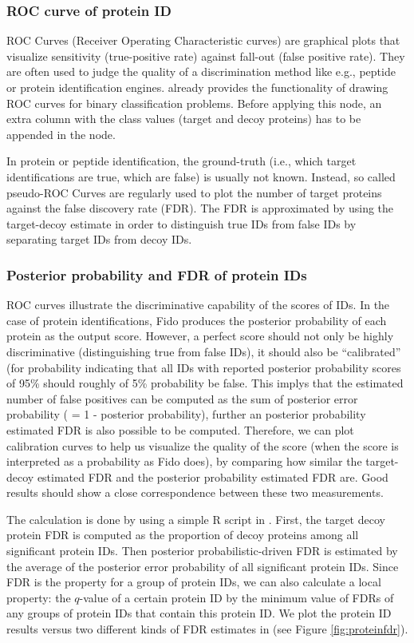 \subsubsection{ROC curve of protein ID}

ROC Curves (Receiver Operating Characteristic curves) are graphical plots that visualize sensitivity (true-positive rate) 
against fall-out (false positive rate). They are often used to judge the quality of a discrimination method like e.g., 
peptide or protein identification engines. 
 already provides the functionality of drawing ROC curves for binary classification problems. 
Before applying this node, an extra column with the class values (target and decoy proteins) has to be appended in 
the  node. 

In protein or peptide identification, the ground-truth (i.e., which target identifications are true, which are false) is usually not known. Instead, so called pseudo-ROC Curves are regularly used to plot the number of target proteins against the false discovery rate (FDR). 
The FDR is approximated by using the target-decoy estimate in order to distinguish
true IDs from false IDs by separating target IDs from decoy IDs.

\subsubsection{Posterior probability and FDR of protein IDs}
ROC curves illustrate the discriminative capability of the scores of IDs. 
In the case of protein identifications, Fido produces the posterior probability of each protein as the output score.
However, a perfect score should not only be highly discriminative (distinguishing true from false IDs), 
it should also be ``calibrated'' (for probability indicating that all IDs with reported posterior probability scores of 95\% 
should roughly of 5\% probability be false. This implys that the estimated number of false positives can be computed as the sum
of posterior error probability ( = 1 - posterior probability), further an posterior probability estimated FDR is also possible to be computed. 
Therefore, we can plot calibration curves to help us visualize the
quality of the score (when the score is interpreted as a probability as Fido does), by comparing how similar the target-decoy estimated FDR and the posterior probability estimated FDR are. Good results should show a close correspondence between these two measurements. 

The calculation is done by using a simple R script in . 
First, the target decoy protein FDR is computed as the proportion of decoy proteins among all significant protein IDs. 
Then posterior probabilistic-driven FDR is estimated by the average of the posterior error probability of all significant protein IDs. Since FDR is the property for a group of protein IDs, we can also calculate a local property: the $q$-value of a certain protein ID by the minimum value of FDRs of any groups of protein IDs that contain this protein ID. 
We plot the protein ID results versus two different kinds of FDR estimates in  (see Figure \ref{fig:proteinfdr}).


